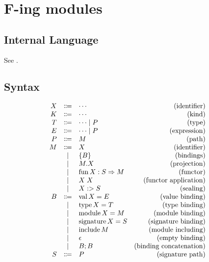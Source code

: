 \section{F-ing modules}

\cite{Rossberg:2014}

\subsection{Internal Language}

See .

\subsection{Syntax}

\begin{align*}
  \begin{array}{rclr}
  X
  & \Coloneq & \cdots &(\text{identifier}) \\
  K
  & \Coloneq & \cdots &(\text{kind}) \\
  T
  & \Coloneq & \cdots \mid P &(\text{type}) \\
  E
  & \Coloneq & \cdots \mid P &(\text{expression}) \\
  P
  & \Coloneq & M &(\text{path}) \\
  M
  & \Coloneq & X &(\text{identifier}) \\
  & \mid & \{ B \} &(\text{bindings}) \\
  & \mid & M.X &(\text{projection}) \\
  & \mid & \symfun X: S \Rightarrow M &(\text{functor}) \\
  & \mid & X\; X &(\text{functor application}) \\
  & \mid & X :> S &(\text{sealing}) \\
  B
  & \Coloneq & \symval X = E &(\text{value binding}) \\
  & \mid & \symtype X = T &(\text{type binding}) \\
  & \mid & \symmodule X = M &(\text{module binding}) \\
  & \mid & \symsignature X = S &(\text{signature binding}) \\
  & \mid & \syminclude M &(\text{module including}) \\
  & \mid & \epsilon &(\text{empty binding}) \\
  & \mid & B; B &(\text{binding concatenation}) \\
  S
  & \Coloneq & P &(\text{signature path}) \\

\end{array}
\end{align*}
